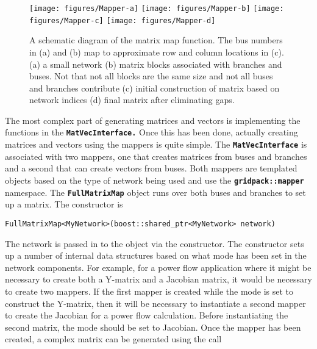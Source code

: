 \begin{figure}
  \centering
    \texttt{[image: figures/Mapper-a]}
    \texttt{[image: figures/Mapper-b]}
    \texttt{[image: figures/Mapper-c]}
    \texttt{[image: figures/Mapper-d]}
  \caption{A schematic diagram of the matrix map function. The bus numbers in (a) and (b) map to approximate row and column locations in (c). (a) a small network (b) matrix blocks associated with branches and buses. Not that not all blocks are the same size and not all buses and branches contribute (c) initial construction of matrix based on network indices (d) final matrix after eliminating gaps.}
  \label{fig:mapper}
\end{figure}

The most complex part of generating matrices and vectors is implementing the functions in the \texttt{\textbf{MatVecInterface.}} Once this has been done, actually creating matrices and vectors using the mappers is quite simple. The \texttt{\textbf{MatVecInterface}} is associated with two mappers, one that creates matrices from buses and branches and a second that can create vectors from buses. Both mappers are templated objects based on the type of network being used and use the \texttt{\textbf{gridpack::mapper}} namespace. The \texttt{\textbf{FullMatrixMap}} object runs over both buses and branches to set up a matrix. The constructor is

{
\color{red}
\begin{Verbatim}[fontseries=b]
FullMatrixMap<MyNetwork>(boost::shared_ptr<MyNetwork> network)
\end{Verbatim}
}

The network is passed in to the object via the constructor. The constructor sets up a number of internal data structures based on what mode has been set in the network components. For example, for a power flow application where it might be necessary to create both a Y-matrix and a Jacobian matrix, it would be necessary to create two mappers. If the first mapper is created while the mode is set to construct the Y-matrix, then it will be necessary to instantiate a second mapper to create the Jacobian for a power flow calculation. Before instantiating the second matrix, the mode should be set to Jacobian.
Once the mapper has been created, a complex matrix can be generated using the call


